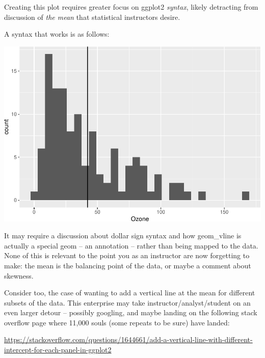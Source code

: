 \documentclass[12pt]{article}
\newenvironment{Shaded}{\begin{snugshade}}{\end{snugshade}}
\newcommand{\AttributeTok}[1]{\textcolor[rgb]{0.77,0.63,0.00}{#1}}
\newcommand{\FunctionTok}[1]{\textcolor[rgb]{0.00,0.00,0.00}{#1}}
\newcommand{\NormalTok}[1]{#1}
\newcommand{\SpecialCharTok}[1]{\textcolor[rgb]{0.00,0.00,0.00}{#1}}
\begin{document}
Creating this plot requires greater focus on ggplot2 \emph{syntax},
likely detracting from discussion of \emph{the mean} that statistical
instructors desire.

A syntax that works is as follows:

\begin{Shaded}
\end{Shaded}

\begin{center}\includegraphics[width=0.5\linewidth]{skeleton_files/figure-latex/unnamed-chunk-3-1} \end{center}

It may require a discussion about dollar sign syntax and how geom\_vline
is actually a special geom -- an annotation -- rather than being mapped
to the data. None of this is relevant to the point you as an instructor
are now forgetting to make: the mean is the balancing point of the data,
or maybe a comment about skewness.

Consider too, the case of wanting to add a vertical line at the mean for
different subsets of the data. This enterprise may take
instructor/analyst/student on an even larger detour -- possibly
googling, and maybe landing on the following stack overflow page where
11,000 souls (some repeats to be sure) have landed:

\url{https://stackoverflow.com/questions/1644661/add-a-vertical-line-with-different-intercept-for-each-panel-in-ggplot2}
\end{document}
